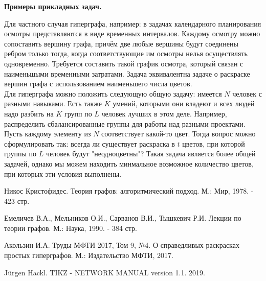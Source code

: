 \documentclass[12pt,a4paper]{article}
\begin{document}
\begin{center}
   \textbf{Примеры прикладных задач.}
\end{center}
\setlength\parindent{24pt}

\indent Для частного случая гиперграфа, например: в задачах календарного планирования осмотры представляются в виде временных интервалов.
Каждому осмотру можно сопоставить вершину графа, причём две любые вершины будут соединены ребром только тогда, когда соответствующие им осмотры нелья осуществлять одновременно.
Требуется составить такой график осмотра, который связан с наименьшыми временными затратами. Задача эквивалентна задаче о раскраске вершин графа с использованием наименьшего числа цветов.\\
\indent Для гиперграфа можно положить следующую общую задачу: имеется $N$ человек с разными навыками. Есть также $K$ умений, которыми они владеют и всех людей надо разбить на $K$ групп по $L$ человек лучших в этом деле. Например, распределить сбалансированные группы для работы над разными проектами.
Пусть каждому элементу из $N$ соответствует какой-то цвет. Тогда вопрос можно сформулировать так: всегда ли существует раскраска в $t$ цветов, при которой группы по $L$ человек будут "неодноцветны"?
Такая задача является более общей задачей, однако мы можем находить минмальное возможное количество цветов, при которых эти условия выполнены.

\pagebreak

\begin{thebibliography}{9}
   Никос Кристофидес. Теория графов: алгоритмический подход. М.: Мир, 1978. - 423 стр.

   Емеличев В.А., Мельников О.И., Сарванов В.И., Тышкевич Р.И. Лекции по теории графов. М.: Наука, 1990. - 384 стр.   

   Акользин И.А. Труды МФТИ 2017, Том 9, №4. О справедливых раскрасках простых гиперграфов. М.: Издательство МФТИ, 2017.

   J{\"u}rgen Hackl. TIKZ - NETWORK MANUAL version 1.1. 2019. 
\end{thebibliography}

\pagebreak

\tableofcontents
\end{document}
